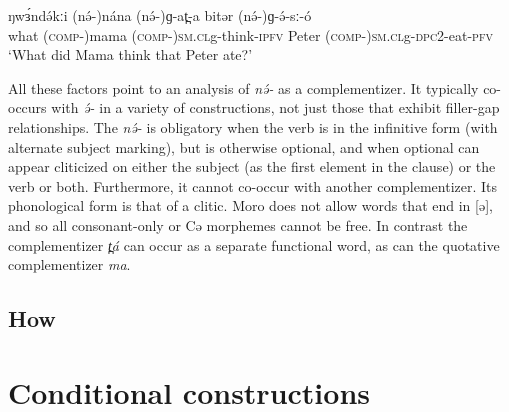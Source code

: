 \ea
\gll	ŋwɜ́ndə́kːi	(nə́-)nána	(nə́-)ɡ-at̪-a	bitər (nə́-)ɡ-ə́-sː-ó \\
what	(\textsc{comp-})mama	(\textsc{comp-})\textsc{sm.cl}g-think-\textsc{ipfv}	Peter (\textsc{comp-})\textsc{sm.cl}g-\textsc{dpc}2-eat-\textsc{pfv}\\
\trans ‘What did Mama think that Peter ate?’\\
\z

All these factors point to an analysis of \textit{nə́-} as a complementizer. It typically co-occurs with \textit{ə́-} in a variety of constructions, not just those that exhibit filler-gap relationships. The \textit{nə́-} is obligatory when the verb is in the infinitive form (with alternate subject marking), but is otherwise optional, and when optional can appear cliticized on either the subject (as the first element in the clause) or the verb or both. Furthermore, it cannot co-occur with another complementizer. Its phonological form is that of a clitic. Moro does not allow words that end in [ə], and so all consonant-only or Cə morphemes cannot be free. In contrast the complementizer \textit{t̪á} can occur as a separate functional word, as can the quotative complementizer \textit{ma}.

\subsection{How}\label{how}


\section{Conditional constructions}


